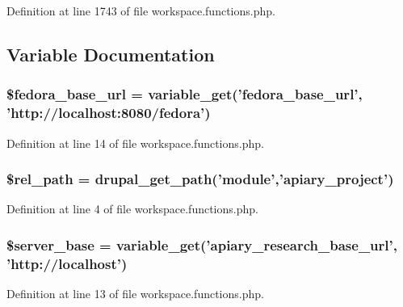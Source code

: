Definition at line 1743 of file workspace.functions.php.



\subsection{Variable Documentation}
\hypertarget{workspace_8functions_8php_aa6646341a4c737489965d44a47caef17}{
\subsubsection[{\$fedora\_\-base\_\-url}]{\setlength{\rightskip}{0pt plus 5cm}\$fedora\_\-base\_\-url = variable\_\-get('fedora\_\-base\_\-url', 'http://localhost:8080/fedora')}}
\label{workspace_8functions_8php_aa6646341a4c737489965d44a47caef17}


Definition at line 14 of file workspace.functions.php.

\hypertarget{workspace_8functions_8php_aea941c07a4c4543da9db61e709571719}{
\subsubsection[{\$rel\_\-path}]{\setlength{\rightskip}{0pt plus 5cm}\$rel\_\-path = drupal\_\-get\_\-path('module','apiary\_\-project')}}
\label{workspace_8functions_8php_aea941c07a4c4543da9db61e709571719}


Definition at line 4 of file workspace.functions.php.

\hypertarget{workspace_8functions_8php_a1ec770754ff6c8671939d992f578d167}{
\subsubsection[{\$server\_\-base}]{\setlength{\rightskip}{0pt plus 5cm}\$server\_\-base = variable\_\-get('apiary\_\-research\_\-base\_\-url', 'http://localhost')}}
\label{workspace_8functions_8php_a1ec770754ff6c8671939d992f578d167}


Definition at line 13 of file workspace.functions.php.

